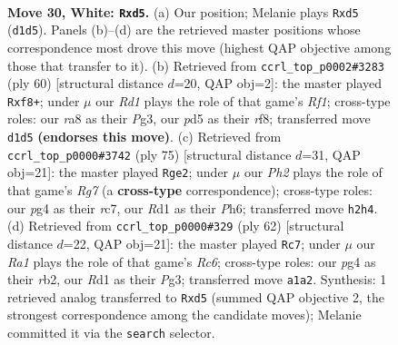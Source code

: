 \documentclass[11pt]{article}
\begin{document}
\clearpage

\begin{figure}[p]\centering
\begin{subfigure}{0.46\textwidth}\centering
\resizebox{\linewidth}{!}{%
\newchessgame
\chessboard[
  setfen={r5k1/8/8/3p4/p5p1/P4r2/6KP/R2R4 w - - 0 30},
  showmover=false,
  pgfstyle=straightmove, color=movearrow, markmove={d1-d5}
]}
\caption{}
\end{subfigure}\hfill
\begin{subfigure}{0.46\textwidth}\centering
\resizebox{\linewidth}{!}{%
\newchessgame
\chessboard[
  setfen={5rk1/p7/1p4p1/1P6/8/6PK/r6P/3R1R2 w - - 0 31},
  showmover=false,
  pgfstyle=straightmove, color=movearrow, markmove={f1-f8}
]}
\caption{}
\end{subfigure}
\\[4pt]
\begin{subfigure}{0.46\textwidth}\centering
\resizebox{\linewidth}{!}{%
\newchessgame
\chessboard[
  setfen={4k3/2R2R2/7p/6p1/6P1/7P/1P1r2r1/7K b - - 0 38},
  showmover=false,
  pgfstyle=straightmove, color=movearrow, markmove={g2-e2}
]}
\caption{}
\end{subfigure}\hfill
\begin{subfigure}{0.46\textwidth}\centering
\resizebox{\linewidth}{!}{%
\newchessgame
\chessboard[
  setfen={6k1/p7/2R1R2p/6p1/3P4/6P1/1r3r1P/6K1 w - - 0 32},
  showmover=false,
  pgfstyle=straightmove, color=movearrow, markmove={c6-c7}
]}
\caption{}
\end{subfigure}
\caption{\textbf{Move 30, White: \texttt{Rxd5}.} (a) Our position; Melanie plays \texttt{Rxd5} (\texttt{d1d5}). Panels (b)--(d) are the retrieved master positions whose correspondence most drove this move (highest QAP objective among those that transfer to it). (b) Retrieved from \texttt{ccrl\_top\_p0002\#3283} (ply 60) [structural distance $d$=20, QAP obj=2]: the master played \texttt{Rxf8+}; under $\mu$ our \emph{Rd1} plays the role of that game's \emph{Rf1}; cross-type roles: our \emph{r}a8 as their \emph{P}g3, our \emph{p}d5 as their \emph{r}f8; transferred move \texttt{d1d5} \textbf{(endorses this move)}. (c) Retrieved from \texttt{ccrl\_top\_p0000\#3742} (ply 75) [structural distance $d$=31, QAP obj=21]: the master played \texttt{Rge2}; under $\mu$ our \emph{Ph2} plays the role of that game's \emph{Rg7} (a \textbf{cross-type} correspondence); cross-type roles: our \emph{p}g4 as their \emph{r}c7, our \emph{R}d1 as their \emph{P}h6; transferred move \texttt{h2h4}. (d) Retrieved from \texttt{ccrl\_top\_p0000\#329} (ply 62) [structural distance $d$=22, QAP obj=21]: the master played \texttt{Rc7}; under $\mu$ our \emph{Ra1} plays the role of that game's \emph{Rc6}; cross-type roles: our \emph{p}g4 as their \emph{r}b2, our \emph{R}d1 as their \emph{P}g3; transferred move \texttt{a1a2}. Synthesis: 1 retrieved analog transferred to \texttt{Rxd5} (summed QAP objective 2, the strongest correspondence among the candidate moves); Melanie committed it via the \texttt{search} selector.}
\label{fig:thought-m58}
\end{figure}
\end{document}
